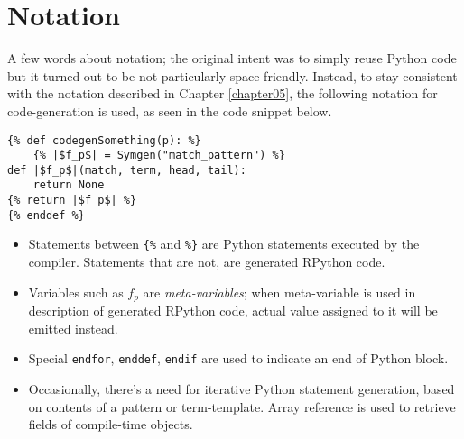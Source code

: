 \section{Notation}

A few words about notation; the original intent was to simply reuse Python code but it turned out to be not particularly space-friendly. Instead, to stay consistent with the notation described in Chapter \ref{chapter05}, the following notation for code-generation is used, as seen in the code snippet below.


\begin{verbatim}
{% def codegenSomething(p): %}
	{% |$f_p$| = Symgen("match_pattern") %}
def |$f_p$|(match, term, head, tail):
	return None
{% return |$f_p$| %}
{% enddef %}
\end{verbatim}

\begin{itemize}
\item Statements between \texttt{\{\%} and \texttt{\%\}} are Python statements executed by the compiler. Statements that are not, are generated RPython code.
\item Variables such as $f_p$ are \textit{meta-variables}; when meta-variable is used in description of generated RPython code, actual value assigned to it will be emitted instead.
\item Special \texttt{endfor}, \texttt{enddef}, \texttt{endif} are used to indicate an end of Python block.
\item Occasionally, there's a need for iterative Python statement generation, based on contents of a pattern or term-template. Array reference is used to retrieve fields of compile-time objects.

\end{itemize}
